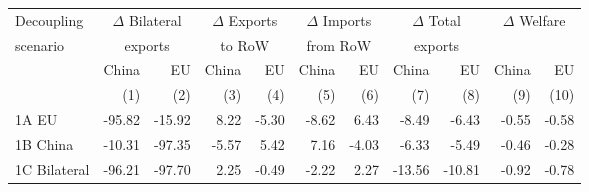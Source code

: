 \begin{tabular}{lrrrrrrrrrr}
  \hline
  Decoupling & \multicolumn{2}{c}{$\Delta$ Bilateral} & \multicolumn{2}{c}{$\Delta$ Exports} & \multicolumn{2}{c}{$\Delta$ Imports} & \multicolumn{2}{c}{$\Delta$ Total} & \multicolumn{2}{c}{$\Delta$ Welfare}\\
scenario & \multicolumn{2}{c}{exports} & \multicolumn{2}{c}{to RoW} & \multicolumn{2}{c}{from RoW} & \multicolumn{2}{c}{exports} & }\\\cmidrule{2-11}
& China & EU & China & EU & China & EU & China & EU & China & EU} \\
& (1) & (2) & (3) & (4) & (5) & (6) & (7) & (8) & (9) & (10)} \\
 \hline
1A EU & -95.82 & -15.92 & 8.22 & -5.30 & -8.62 & 6.43 & -8.49 & -6.43 & -0.55 & -0.58 \\ 
  1B China & -10.31 & -97.35 & -5.57 & 5.42 & 7.16 & -4.03 & -6.33 & -5.49 & -0.46 & -0.28 \\ 
  1C Bilateral & -96.21 & -97.70 & 2.25 & -0.49 & -2.22 & 2.27 & -13.56 & -10.81 & -0.92 & -0.78 \\ 
   \hline
\end{tabular}
